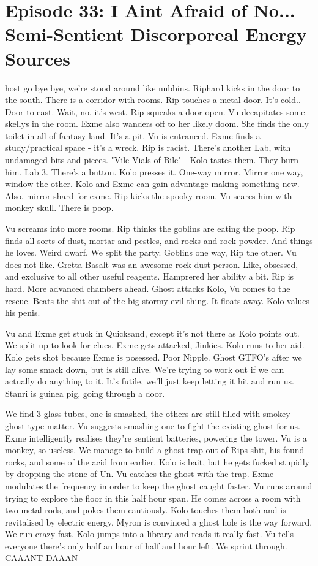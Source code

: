 \section{Episode 33: I Aint Afraid of No... Semi-Sentient Discorporeal Energy Sources}

\medskip

host go bye bye, we’re stood around like nubbins. Riphard kicks in the door to the south. There is a corridor with rooms. Rip touches a metal door. It’s cold.. Door to east. Wait, no, it’s west. Rip squeaks a door open. Vu decapitates some skellys in the room. Exme also wanders off to her likely doom. She finds the only toilet in all of fantasy land. It’s a pit. Vu is entranced. Exme finds a study/practical space - it’s a wreck. Rip is racist. There’s another Lab, with undamaged bits and pieces. "Vile Vials of Bile" - Kolo tastes them. They burn him. Lab 3. There’s a button. Kolo presses it. One-way mirror. Mirror one way, window the other. Kolo and Exme can gain advantage making something new. Also, mirror shard for exme. Rip kicks the spooky room. Vu scares him with monkey skull. There is poop.\medskip

Vu screams into more rooms. Rip thinks the goblins are eating the poop. Rip finds all sorts of dust, mortar and pestles, and rocks and rock powder. And things he loves. Weird dwarf. We split the party. Goblins one way, Rip the other. Vu does not like. Gretta Basalt was an awesome rock-dust person. Like, obsessed, and exclusive to all other useful reagents. Hamprered her ability a bit. Rip is hard. More advanced chambers ahead. Ghost attacks Kolo, Vu comes to the rescue. Beats the shit out of the big stormy evil thing. It floats away. Kolo values his penis.\medskip

Vu and Exme get stuck in Quicksand, except it’s not there as Kolo points out. We split up to look for clues. Exme gets attacked, Jinkies. Kolo runs to her aid. Kolo gets shot because Exme is posessed. Poor Nipple. Ghost GTFO’s after we lay some smack down, but is still alive. We’re trying to work out if we can actually do anything to it. It’s futile, we’ll just keep letting it hit and run us. Stanri is guinea pig, going through a door.\medskip

We find 3 glass tubes, one is smashed, the others are still filled with smokey ghost-type-matter. Vu suggests smashing one to fight the existing ghost for us. Exme intelligently realises they’re sentient batteries, powering the tower. Vu is a monkey, so useless. We manage to build a ghost trap out of Rips shit, his found rocks, and some of the acid from earlier. Kolo is bait, but he gets fucked stupidly by dropping the stone of Un. Vu catches the ghost with the trap. Exme modulates the frequency in order to keep the ghost caught faster. Vu runs around trying to explore the floor in this half hour span. He comes across a room with two metal rods, and pokes them cautiously. Kolo touches them both and is revitalised by electric energy. Myron is convinced a ghost hole is the way forward. We run crazy-fast. Kolo jumps into a library and reads it really fast. Vu tells everyone there’s only half an hour of half and hour left. We sprint through. CAAANT DAAAN\medskip

